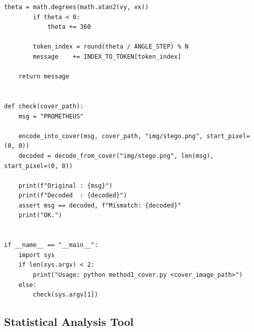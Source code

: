\documentclass[12pt]{article}
\begin{document}
\begin{lstlisting}[caption={Cover-image encoder and decoder
(\texttt{method.py})}, label={lst:cover}]
        theta = math.degrees(math.atan2(vy, vx))
        if theta < 0:
            theta += 360

        token_index = round(theta / ANGLE_STEP) % N
        message    += INDEX_TO_TOKEN[token_index]

    return message


def check(cover_path):
    msg = "PROMETHEUS"

    encode_into_cover(msg, cover_path, "img/stego.png", start_pixel=(0, 0))
    decoded = decode_from_cover("img/stego.png", len(msg), start_pixel=(0, 0))

    print(f"Original : {msg}")
    print(f"Decoded  : {decoded}")
    assert msg == decoded, f"Mismatch: {decoded}"
    print("OK.")


if __name__ == "__main__":
    import sys
    if len(sys.argv) < 2:
        print("Usage: python method1_cover.py <cover_image_path>")
    else:
        check(sys.argv[1])
\end{lstlisting}

\subsection{Statistical Analysis Tool}
\end{document}
